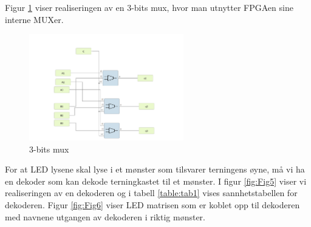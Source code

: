 Figur \ref{fig:Fig4} viser realiseringen av en 3-bits mux, hvor man utnytter FPGAen sine interne MUXer.

\begin{figure}[htbp]
  \centering
  \includegraphics[width=0.6\textwidth]{Bilder/3-bit_MUX.png} 
  \caption{3-bits mux}
  \label{fig:Fig4}
\end{figure}

For at LED lysene skal lyse i et mønster som tilsvarer terningens øyne, må vi ha en dekoder som kan dekode terningkastet til et mønster. I figur \ref{fig:Fig5} viser vi realiseringen av en dekoderen og i tabell \ref{table:tab1} vises sannhetstabellen for dekoderen. Figur \ref{fig:Fig6} viser LED matrisen som er koblet opp til dekoderen med navnene utgangen av dekoderen i riktig mønster.

